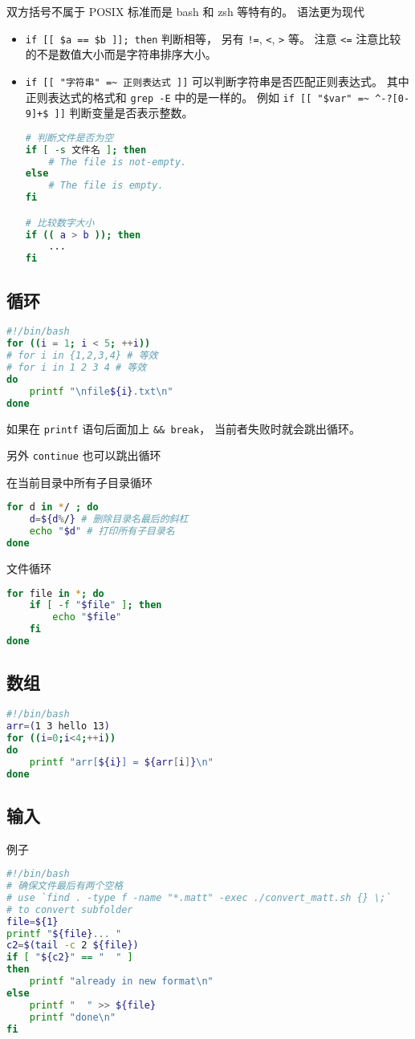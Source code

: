 双方括号不属于 POSIX 标准而是 bash 和 zsh 等特有的。 语法更为现代
\begin{itemize}
\item \verb`if [[ $a == $b ]]; then` 判断相等， 另有 \verb`!=`, \verb`<`, \verb`>` 等。 注意 \verb`<=` 注意比较的不是数值大小而是字符串排序大小。
\item \verb`if [[ "字符串" =~ 正则表达式 ]]` 可以判断字符串是否匹配正则表达式。 其中正则表达式的格式和 \verb`grep -E` 中的是一样的。 例如 \verb`if [[ "$var" =~ ^-?[0-9]+$ ]]` 判断变量是否表示整数。
\begin{lstlisting}[language=bash]
# 判断文件是否为空
if [ -s 文件名 ]; then
    # The file is not-empty.
else
    # The file is empty.
fi

# 比较数字大小
if (( a > b )); then
    ...
fi
\end{lstlisting}
\end{itemize}

\subsection{循环}
\begin{lstlisting}[language=bash]
#!/bin/bash
for ((i = 1; i < 5; ++i))
# for i in {1,2,3,4} # 等效
# for i in 1 2 3 4 # 等效
do
	printf "\nfile${i}.txt\n"
done
\end{lstlisting}
如果在 \verb`printf` 语句后面加上 \verb`&& break`， 当前者失败时就会跳出循环。

另外 \verb`continue` 也可以跳出循环

在当前目录中所有子目录循环
\begin{lstlisting}[language=bash]
for d in */ ; do
    d=${d%/} # 删除目录名最后的斜杠
    echo "$d" # 打印所有子目录名
done
\end{lstlisting}
文件循环
\begin{lstlisting}[language=bash]
for file in *; do
    if [ -f "$file" ]; then
        echo "$file"
    fi
done
\end{lstlisting}

\subsection{数组}
\begin{lstlisting}[language=bash]
#!/bin/bash
arr=(1 3 hello 13)
for ((i=0;i<4;++i))
do
    printf "arr[${i}] = ${arr[i]}\n"
done
\end{lstlisting}


\subsection{输入}
例子
\begin{lstlisting}[language=bash]
#!/bin/bash
# 确保文件最后有两个空格
# use `find . -type f -name "*.matt" -exec ./convert_matt.sh {} \;`
# to convert subfolder
file=${1}
printf "${file}... "
c2=$(tail -c 2 ${file})
if [ "${c2}" == "  " ]
then
	printf "already in new format\n"
else
	printf "  " >> ${file}
	printf "done\n"
fi
\end{lstlisting}

